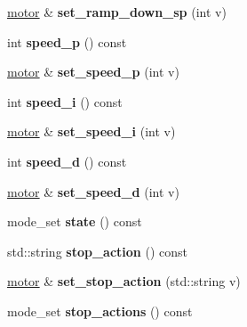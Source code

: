 \begin{DoxyCompactItemize}
\hyperlink{classev3dev_1_1motor}{motor} \& {\bfseries set\+\_\+ramp\+\_\+down\+\_\+sp} (int v)
\item 
\mbox{\label{classev3dev_1_1motor_a1776fe987d8335f571ad877b47788be2}} 
int {\bfseries speed\+\_\+p} () const
\item 
\mbox{\label{classev3dev_1_1motor_a2bbccc3a0979f5714bfb28765afbba97}} 
\hyperlink{classev3dev_1_1motor}{motor} \& {\bfseries set\+\_\+speed\+\_\+p} (int v)
\item 
\mbox{\label{classev3dev_1_1motor_af9b486a639edfbd5717607be16bea175}} 
int {\bfseries speed\+\_\+i} () const
\item 
\mbox{\label{classev3dev_1_1motor_afe3f8b89f2c0b0f04074400e275c74aa}} 
\hyperlink{classev3dev_1_1motor}{motor} \& {\bfseries set\+\_\+speed\+\_\+i} (int v)
\item 
\mbox{\label{classev3dev_1_1motor_a3709b06676b8eccecdb09a8d97c287da}} 
int {\bfseries speed\+\_\+d} () const
\item 
\mbox{\label{classev3dev_1_1motor_ad0ecca48986abad675447be2f2bc36e6}} 
\hyperlink{classev3dev_1_1motor}{motor} \& {\bfseries set\+\_\+speed\+\_\+d} (int v)
\item 
\mbox{\label{classev3dev_1_1motor_ad60855771ea39e8e2bd81885698d9b19}} 
mode\+\_\+set {\bfseries state} () const
\item 
\mbox{\label{classev3dev_1_1motor_ac4679c217ce2754d33492ed7d96f1013}} 
std\+::string {\bfseries stop\+\_\+action} () const
\item 
\mbox{\label{classev3dev_1_1motor_a914f611afd466b1750402df4fe84173f}} 
\hyperlink{classev3dev_1_1motor}{motor} \& {\bfseries set\+\_\+stop\+\_\+action} (std\+::string v)
\item 
\mbox{\label{classev3dev_1_1motor_a516a7b8ea0cfca3e5dba2f48ccec770d}} 
mode\+\_\+set {\bfseries stop\+\_\+actions} () const
\item 

\end{DoxyCompactItemize}

